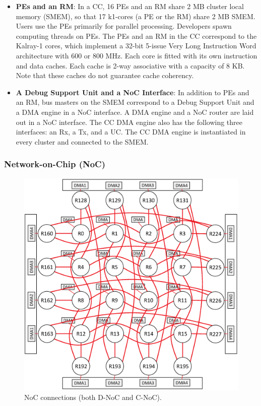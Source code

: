   \begin{itemize}
    \setlength{\leftskip}{-5mm}    
    \item \textbf{PEs and an RM}:
    In a CC, 16 PEs and an RM share 2 MB cluster local memory (SMEM), so that 17 k1-cores (a PE or the RM) share 2 MB SMEM.
    Users use the PEs primarily for parallel processing.
    Developers spawn computing threads on PEs.
    The PEs and an RM in the CC correspond to the Kalray-1 cores, which implement a 32-bit 5-issue Very Long Instruction Word architecture with 600 or 800 MHz.
    Each core is fitted with its own instruction and data caches.
    Each cache is 2-way associative with a capacity of 8 KB.
    Note that these caches do not guarantee cache coherency.
    
    \item \textbf{A Debug Support Unit and a NoC Interface}:
    In addition to PEs and an RM, bus masters on the SMEM correspond to a Debug Support Unit and a DMA engine in a NoC interface.
    A DMA engine and a NoC router are laid out in a NoC interface.
    The CC DMA engine also has the following three interfaces: an Rx, a Tx, and a UC. 
    The CC DMA engine is instantiated in every cluster and connected to the SMEM.
  \end{itemize}
  
  \subsubsection{Network-on-Chip (NoC)}
  \label{sec:noc}

  \begin{figure}[t]
    \centering
    \includegraphics[width=0.9\linewidth]{../figure/noc_map.eps}
        \caption{\label{fig:noc_map}
      NoC connections (both D-NoC and C-NoC).}
  \end{figure}

